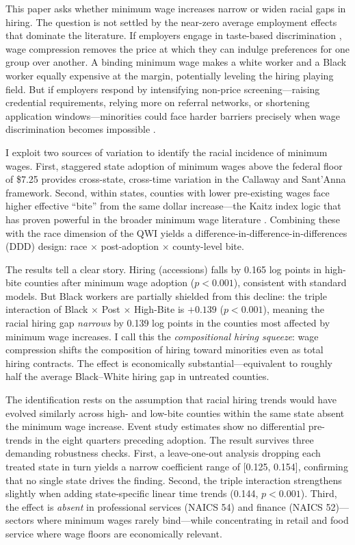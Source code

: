 \documentclass[12pt]{article}
\begin{document}
This paper asks whether minimum wage increases narrow or widen racial gaps in hiring. The question is not settled by the near-zero average employment effects that dominate the literature. If employers engage in taste-based discrimination \citep{becker1957economics}, wage compression removes the price at which they can indulge preferences for one group over another. A binding minimum wage makes a white worker and a Black worker equally expensive at the margin, potentially leveling the hiring playing field. But if employers respond by intensifying non-price screening---raising credential requirements, relying more on referral networks, or shortening application windows---minorities could face harder barriers precisely when wage discrimination becomes impossible \citep{autor2003skill, neumark2006minimum}.

I exploit two sources of variation to identify the racial incidence of minimum wages. First, staggered state adoption of minimum wages above the federal floor of \$7.25 provides cross-state, cross-time variation in the Callaway and Sant'Anna \citeyearpar{callaway2021difference} framework. Second, within states, counties with lower pre-existing wages face higher effective ``bite'' from the same dollar increase---the Kaitz index logic that has proven powerful in the broader minimum wage literature \citep{kaitz1970experience}. Combining these with the race dimension of the QWI yields a difference-in-difference-in-differences (DDD) design: race $\times$ post-adoption $\times$ county-level bite.

The results tell a clear story. Hiring (accessions) falls by 0.165 log points in high-bite counties after minimum wage adoption ($p < 0.001$), consistent with standard models. But Black workers are partially shielded from this decline: the triple interaction of Black $\times$ Post $\times$ High-Bite is $+0.139$ ($p < 0.001$), meaning the racial hiring gap \textit{narrows} by 0.139 log points in the counties most affected by minimum wage increases. I call this the \textit{compositional hiring squeeze}: wage compression shifts the composition of hiring toward minorities even as total hiring contracts. The effect is economically substantial---equivalent to roughly half the average Black--White hiring gap in untreated counties.

The identification rests on the assumption that racial hiring trends would have evolved similarly across high- and low-bite counties within the same state absent the minimum wage increase. Event study estimates show no differential pre-trends in the eight quarters preceding adoption. The result survives three demanding robustness checks. First, a leave-one-out analysis dropping each treated state in turn yields a narrow coefficient range of [0.125, 0.154], confirming that no single state drives the finding. Second, the triple interaction strengthens slightly when adding state-specific linear time trends (0.144, $p < 0.001$). Third, the effect is \textit{absent} in professional services (NAICS 54) and finance (NAICS 52)---sectors where minimum wages rarely bind---while concentrating in retail and food service where wage floors are economically relevant.
\end{document}
